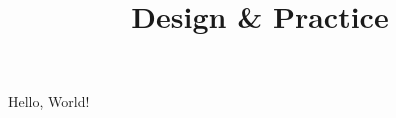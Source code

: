 \documentclass[a4paper]{report}
\title{Design & Practice}
\begin{document}
    \maketitle
    \tableofcontents
    Hello, World!

    
\end{document}
